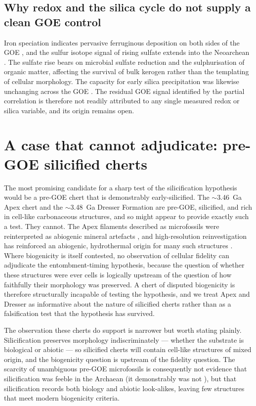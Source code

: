 \documentclass[11pt]{article}
\begin{document}
\subsection{Why redox and the silica cycle do not supply a clean GOE control}

Iron speciation indicates pervasive ferruginous deposition on both sides of the GOE
\citep{Canfield1998,Poulton2011}, and the sulfur isotope signal of rising sulfate extends into the
Neoarchean \citep{Reinhard2009,Philippot2018}. The sulfate rise bears on microbial sulfate
reduction and the sulphurisation of organic matter, affecting the survival of bulk kerogen rather
than the templating of cellular morphology. The capacity for early silica precipitation was likewise
unchanging across the GOE \citep{Siever1992,Perry2007}. The residual GOE signal identified by the
partial correlation is therefore not readily attributed to any single measured redox or silica
variable, and its origin remains open.

\section{A case that cannot adjudicate: pre-GOE silicified cherts}\label{sec:falsify}

The most promising candidate for a sharp test of the silicification hypothesis would be a pre-GOE
chert that is demonstrably early-silicified. The $\sim$3.46~Ga Apex chert and the $\sim$3.48~Ga
Dresser Formation are pre-GOE, silicified, and rich in cell-like carbonaceous structures, and so
might appear to provide exactly such a test. They cannot. The Apex filaments described as
microfossils \citep{Schopf1993} were reinterpreted as abiogenic mineral artefacts
\citep{Brasier2002}, and high-resolution reinvestigation has reinforced an abiogenic, hydrothermal
origin for many such structures \citep{Wacey2014}. Where biogenicity is itself contested, no
observation of cellular fidelity can adjudicate the entombment-timing hypothesis, because the
question of whether these structures were ever cells is logically upstream of the question of how
faithfully their morphology was preserved. A chert of disputed biogenicity is therefore structurally
incapable of testing the hypothesis, and we treat Apex and Dresser as informative about the nature
of silicified cherts rather than as a falsification test that the hypothesis has survived.

The observation these cherts do support is narrower but worth stating plainly. Silicification
preserves morphology indiscriminately --- whether the substrate is biological or abiotic --- so
silicified cherts will contain cell-like structures of mixed origin, and the biogenicity question is
upstream of the fidelity question. The scarcity of unambiguous pre-GOE microfossils is consequently
not evidence that silicification was feeble in the Archaean (it demonstrably was not
\citep{Siever1992,Perry2007}), but that silicification records both biology and abiotic look-alikes,
leaving few structures that meet modern biogenicity criteria.
\end{document}
